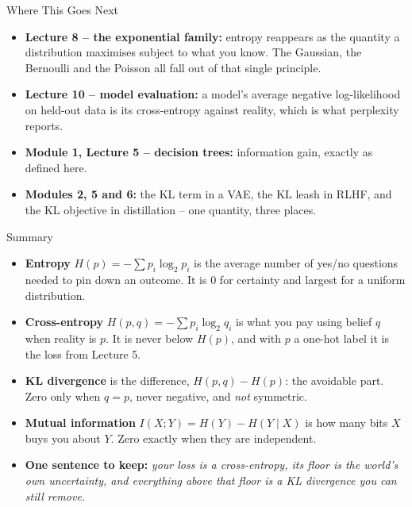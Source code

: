 \begin{frame}{Where This Goes Next}
\begin{itemize}
  \item \textbf{Lecture 8 -- the exponential family:} entropy reappears as the quantity a distribution maximises subject to what you know. The Gaussian, the Bernoulli and the Poisson all fall out of that single principle.
  \pause
  \item \textbf{Lecture 10 -- model evaluation:} a model's average negative log-likelihood on held-out data is its cross-entropy against reality, which is what perplexity reports.
  \pause
  \item \textbf{Module 1, Lecture 5 -- decision trees:} information gain, exactly as defined here.
  \pause
  \item \textbf{Modules 2, 5 and 6:} the KL term in a VAE, the KL leash in RLHF, and the KL objective in distillation -- one quantity, three places.
\end{itemize}
\end{frame}

\begin{frame}{Summary}
\begin{itemize}
  \item \textbf{Entropy} $H(p) = -\sum p_i \log_2 p_i$ is the average number of yes/no questions needed to pin down an outcome. It is $0$ for certainty and largest for a uniform distribution.
  \pause
  \item \textbf{Cross-entropy} $H(p,q) = -\sum p_i \log_2 q_i$ is what you pay using belief $q$ when reality is $p$. It is never below $H(p)$, and with $p$ a one-hot label it is the loss from Lecture 5.
  \pause
  \item \textbf{KL divergence} is the difference, $H(p,q) - H(p)$: the avoidable part. Zero only when $q = p$, never negative, and \emph{not} symmetric.
  \pause
  \item \textbf{Mutual information} $I(X;Y) = H(Y) - H(Y \mid X)$ is how many bits $X$ buys you about $Y$. Zero exactly when they are independent.
  \pause
  \item \textbf{One sentence to keep:} \emph{your loss is a cross-entropy, its floor is the world's own uncertainty, and everything above that floor is a KL divergence you can still remove.}
\end{itemize}
\end{frame}

